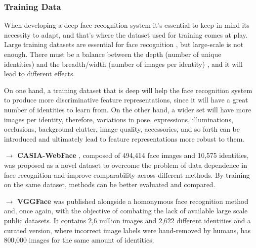 \documentclass[class=report, crop=false, a4paper, 12pt]{standalone}
\begin{document}
\subsubsection{\large Training Data}
\par When developing a deep face recognition system it's essential to keep in mind its necessity to adapt, and that's where the dataset used for training comes at play. Large training datasets are essential for face recognition \autocite{parkhiDeepFaceRecognition2015}, but large-scale is not enough. There must be a balance between the depth (number of unique identities) and the breadth/width (number of images per identity) \autocite{bansalDonTsCNNbased2017, caoVGGFace2DatasetRecognising2018}, and it will lead to different effects. 
\par On one hand, a training dataset that is deep will help the face recognition system to produce more discriminative feature representations, since it will have a great number of identities to learn from. On the other hand, a wider set will have more images per identity, therefore, variations in pose, expressions, illuminations, occlusions, background clutter, image quality, accessories, and so forth \autocite{baeDigiFace1MMillionDigital2023} can be introduced and ultimately lead to feature representations more robust to them.


\vspace{0.7\baselineskip}
\noindent\textbf{$\rightarrow$ CASIA-WebFace} \autocite{yiLearningFaceRepresentation2014}, composed of 494,414 face images and 10,575 identities, was proposed as a novel dataset to overcome the problem of data dependence in face recognition and improve comparability across different methods. By training on the same dataset, methods can be better evaluated and compared.

\vspace{0.7\baselineskip}
\noindent\textbf{$\rightarrow$ VGGFace} \autocite{parkhiDeepFaceRecognition2015} was published alongside a homonymous face recognition method and, once again, with the objective of combating the lack of available large scale public datasets. It contains 2,6 million images and 2,622 different identities and a curated version, where incorrect image labels were hand-removed by humans, has 800,000 images for the same amount of identities.
\end{document}

